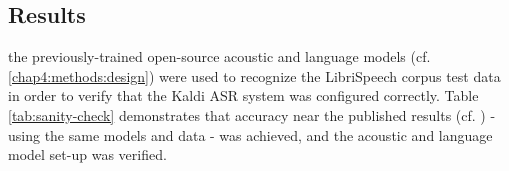 



\subsection{Results}
\label{chap4:results}

the previously-trained open-source acoustic and language models (cf. \ref{chap4:methods:design}) were used to recognize the LibriSpeech corpus test data in order to verify that the Kaldi ASR system was configured correctly.  Table \ref{tab:sanity-check} demonstrates that accuracy near the published results (cf. \cite{panayotov:15}) - using the same models and data - was achieved, and the acoustic and language model set-up was verified.

